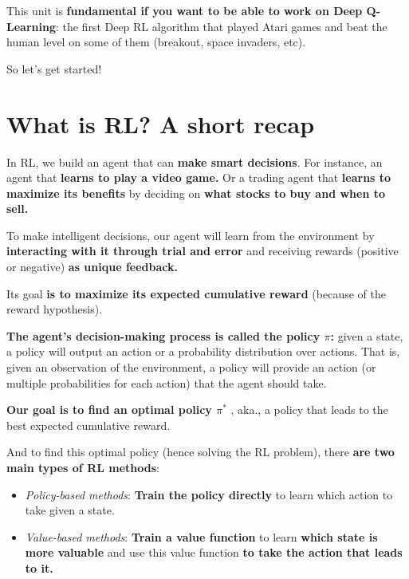 \documentclass[11pt,a4paper]{article}
\begin{document}
This unit is \textbf{fundamental if you want to be able to work on Deep Q-Learning}: the first Deep RL algorithm that played Atari games and beat the human level on some of them (breakout, space invaders, etc).

So let's get started!

\section{What is RL? A short recap}\label{what-is-rl-a-short-recap}

In RL, we build an agent that can \textbf{make smart decisions}. For instance, an agent that \textbf{learns to play a video game.} Or a trading agent that \textbf{learns to maximize its benefits} by deciding on \textbf{what stocks to buy and when to sell.}


To make intelligent decisions, our agent will learn from the environment by \textbf{interacting with it through trial and error} and receiving rewards (positive or negative) \textbf{as unique feedback.}

Its goal \textbf{is to maximize its expected cumulative reward} (because of the reward hypothesis).

\textbf{The agent's decision-making process is called the policy \(\pi\):} given a state, a policy will output an action or a probability distribution over actions. That is, given an observation of the environment, a policy will provide an action (or multiple probabilities for each action) that the agent should take.


\textbf{Our goal is to find an optimal policy \(\pi^*\) }, aka., a policy that leads to the best expected cumulative reward.

And to find this optimal policy (hence solving the RL problem), there \textbf{are two main types of RL methods}:

\begin{itemize}
\tightlist
\item
  \emph{Policy-based methods}: \textbf{Train the policy directly} to learn which action to take given a state.
\item
  \emph{Value-based methods}: \textbf{Train a value function} to learn \textbf{which state is more valuable} and use this value function \textbf{to take the action that leads to it.}
\end{itemize}
\end{document}
